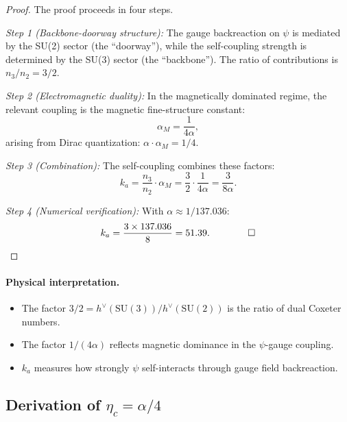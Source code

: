 \begin{proof}
The proof proceeds in four steps.

\textit{Step 1 (Backbone-doorway structure):} The gauge backreaction on $\psi$ is mediated by the SU(2) sector (the ``doorway''), while the self-coupling strength is determined by the SU(3) sector (the ``backbone''). The ratio of contributions is $n_3/n_2 = 3/2$.

\textit{Step 2 (Electromagnetic duality):} In the magnetically dominated regime, the relevant coupling is the magnetic fine-structure constant:
\begin{equation}
\alpha_M = \frac{1}{4\alpha},
\end{equation}
arising from Dirac quantization: $\alpha \cdot \alpha_M = 1/4$.

\textit{Step 3 (Combination):} The self-coupling combines these factors:
\begin{equation}
k_a = \frac{n_3}{n_2} \cdot \alpha_M = \frac{3}{2} \cdot \frac{1}{4\alpha} = \frac{3}{8\alpha}.
\end{equation}

\textit{Step 4 (Numerical verification):} With $\alpha \approx 1/137.036$:
\begin{equation}
k_a = \frac{3 \times 137.036}{8} = 51.39. \qquad \qed
\end{equation}
\end{proof}

\paragraph{Physical interpretation.}
\begin{itemize}
\item The factor $3/2 = h^\vee(\text{SU}(3))/h^\vee(\text{SU}(2))$ is the ratio of dual Coxeter numbers.
\item The factor $1/(4\alpha)$ reflects magnetic dominance in the $\psi$-gauge coupling.
\item $k_a$ measures how strongly $\psi$ self-interacts through gauge field backreaction.
\end{itemize}

\subsection{Derivation of $\eta_c = \alpha/4$}\label{app:eta-derivation}

